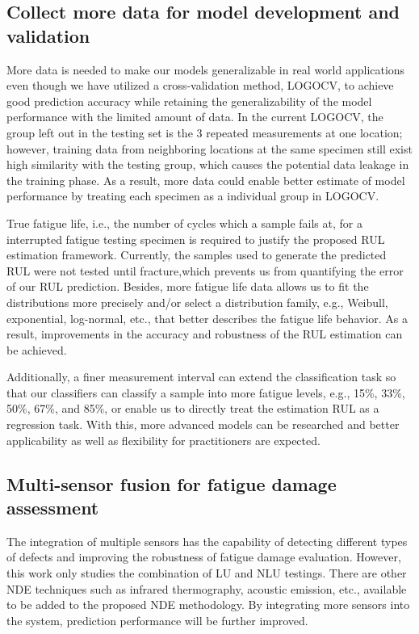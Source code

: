 \subsection{Collect more data for model development and validation}
More data is needed to make our models generalizable in real world applications even though we have utilized a cross-validation method, LOGOCV, to achieve good prediction accuracy while retaining the generalizability of the model performance with the limited amount of data. In the current LOGOCV, the group left out in the testing set is the 3 repeated measurements at one location; however, training data from neighboring locations at the same specimen still exist high similarity with the testing group, which causes the potential data leakage in the training phase. As a result, more data could enable better estimate of model performance by treating each specimen as a individual group in LOGOCV.

True fatigue life, i.e., the number of cycles which a sample fails at, for a interrupted fatigue testing specimen is required to justify the proposed RUL estimation framework. Currently, the samples used to generate the predicted RUL were not tested until fracture,which prevents us from quantifying the error of our RUL prediction. Besides, more fatigue life data allows us to fit the distributions more precisely and/or select a distribution family, e.g., Weibull, exponential, log-normal, etc., that better describes the fatigue life behavior. As a result, improvements in the accuracy and robustness of the RUL estimation can be achieved.

Additionally, a finer measurement interval can extend the classification task so that our classifiers can classify a sample into more fatigue levels, e.g., 15\%, 33\%, 50\%, 67\%, and 85\%, or enable us to directly treat the estimation RUL as a regression task. With this, more advanced models can be researched and better applicability as well as flexibility for practitioners are expected.

\subsection{Multi-sensor fusion for fatigue damage assessment}
The integration of multiple sensors has the capability of detecting different types of defects and improving the robustness of fatigue damage evaluation. However, this work only studies the combination of LU and NLU testings. There are other NDE techniques such as infrared thermography, acoustic emission, etc., available to be added to the proposed NDE methodology. By integrating more sensors into the system, prediction performance will be further improved.

